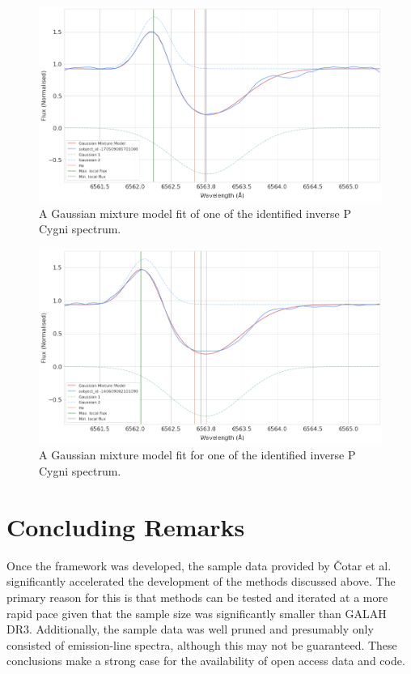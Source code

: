\begin{figure}[!htb]
\centering
\includegraphics[scale=0.45]{figures/inverse p cygni 1.png}
\caption{A Gaussian mixture model fit of one of the identified inverse P Cygni spectrum. }
\end{figure}

\begin{figure}[!htb]
\centering
\includegraphics[scale=0.45]{figures/inverse p cygni fitted 2.png}
\caption{A Gaussian mixture model fit for one of the identified inverse P Cygni spectrum.}
\end{figure}

\section{Concluding Remarks}

Once the framework was developed, the sample data provided by Čotar et al. significantly accelerated the development of the methods discussed above. The primary reason for this is that methods can be tested and iterated at a more rapid pace given that the sample size was significantly smaller than GALAH DR3. Additionally, the sample data was well pruned and presumably only consisted of emission-line spectra, although this may not be guaranteed. These conclusions make a strong case for the availability of open access data and code.

